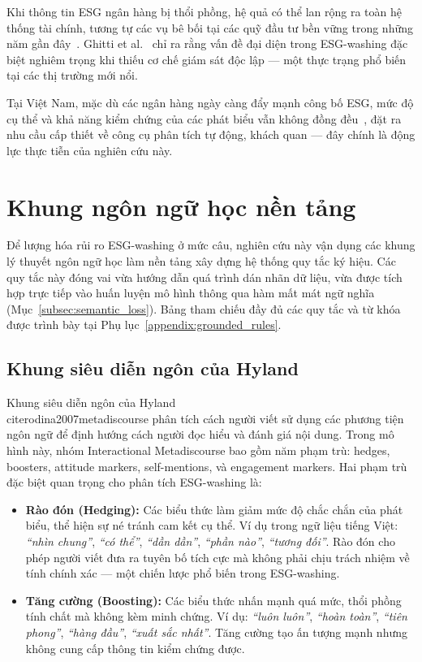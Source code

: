 Khi thông tin ESG ngân hàng bị thổi phồng, hệ quả có thể lan rộng ra toàn hệ thống tài chính, tương tự các vụ bê bối tại các quỹ đầu tư bền vững trong những năm gần đây~\cite{lipenkova2023detecting}. Ghitti et al.~\cite{ghitti2024agency} chỉ ra rằng vấn đề đại diện trong ESG-washing đặc biệt nghiêm trọng khi thiếu cơ chế giám sát độc lập --- một thực trạng phổ biến tại các thị trường mới nổi.

Tại Việt Nam, mặc dù các ngân hàng ngày càng đẩy mạnh công bố ESG, mức độ cụ thể và khả năng kiểm chứng của các phát biểu vẫn không đồng đều~\cite{buchetti2025literature}, đặt ra nhu cầu cấp thiết về công cụ phân tích tự động, khách quan --- đây chính là động lực thực tiễn của nghiên cứu này.


\section{Khung ngôn ngữ học nền tảng}
\label{sec:linguistic_frameworks}

Để lượng hóa rủi ro ESG-washing ở mức câu, nghiên cứu này vận dụng các khung lý thuyết ngôn ngữ học làm nền tảng xây dựng hệ thống quy tắc ký hiệu. Các quy tắc này đóng vai vừa hướng dẫn quá trình dán nhãn dữ liệu, vừa được tích hợp trực tiếp vào huấn luyện mô hình thông qua hàm mất mát ngữ nghĩa (Mục~\ref{subsec:semantic_loss}). Bảng tham chiếu đầy đủ các quy tắc và từ khóa được trình bày tại Phụ lục~\ref{appendix:grounded_rules}.

\subsection{Khung siêu diễn ngôn của Hyland}
\label{subsec:hyland}

Khung siêu diễn ngôn của Hyland~\\cite{rodina2007metadiscourse} phân tích cách người viết sử dụng các phương tiện ngôn ngữ để định hướng cách người đọc hiểu và đánh giá nội dung. Trong mô hình này, nhóm Interactional Metadiscourse bao gồm năm phạm trù: hedges, boosters, attitude markers, self-mentions, và engagement markers. Hai phạm trù đặc biệt quan trọng cho phân tích ESG-washing là:

\begin{itemize}
    \item \textbf{Rào đón (Hedging):} Các biểu thức làm giảm mức độ chắc chắn của phát biểu, thể hiện sự né tránh cam kết cụ thể. Ví dụ trong ngữ liệu tiếng Việt: \textit{``nhìn chung''}, \textit{``có thể''}, \textit{``dần dần''}, \textit{``phần nào''}, \textit{``tương đối''}. Rào đón cho phép người viết đưa ra tuyên bố tích cực mà không phải chịu trách nhiệm về tính chính xác --- một chiến lược phổ biến trong ESG-washing.

    \item \textbf{Tăng cường (Boosting):} Các biểu thức nhấn mạnh quá mức, thổi phồng tính chất mà không kèm minh chứng. Ví dụ: \textit{``luôn luôn''}, \textit{``hoàn toàn''}, \textit{``tiên phong''}, \textit{``hàng đầu''}, \textit{``xuất sắc nhất''}. Tăng cường tạo ấn tượng mạnh nhưng không cung cấp thông tin kiểm chứng được.
\end{itemize}

